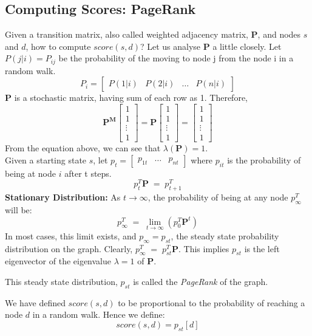 \documentclass{article}
\begin{document}
\subsection{Computing Scores: PageRank}
Given a transition matrix, also called weighted adjacency matrix, $\mathbf P$, and nodes $s$ and $d$, how to compute $score(s,d)$?
Let us analyse $\mathbf P$ a little closely. Let $P(j|i) = P_{ij}$ be the probability of the moving to node j from the node i in a random walk.
\begin{equation*}
    P_ i = 
    \begin{bmatrix}
    P(1 | i) & P(2 | i) & \dots & P(n | i) 
    \end{bmatrix}
\end{equation*}
$\mathbf P$ is a stochastic matrix, having sum of each row as 1. Therefore,
\begin{equation*}
    \mathbf{P^M}
    \begin{bmatrix}
    1 \\ 1 \\ \vdots \\ 1
    \end{bmatrix} = 
    \mathbf{P}
    \begin{bmatrix}
    1 \\ 1 \\ \vdots \\ 1
    \end{bmatrix} = 
    \begin{bmatrix}
    1 \\ 1 \\ \vdots \\ 1
    \end{bmatrix}
\end{equation*}
From the equation above, we can see that $\lambda(\mathbf{P}) = 1$.\\
Given a starting state $s$, let $p_t = \begin{bmatrix}
    p_{1t} & \dots & p_{nt} 
    \end{bmatrix}$ where $p_{it}$ is the probability of being at node $i$ after t steps.
\begin{equation*}
    p_t^T \mathbf{P} \; = \; p_{t+1}^T
\end{equation*}
\textbf{Stationary Distribution:} As $t\to \infty$, the probability of being at any node $p_{\infty}^T$ will be:
\begin{equation*}
    p_{\infty}^T \; = \; \lim_{t \to \infty}{(p_0^T \mathbf{P}^t)}
\end{equation*}
In most cases, this limit exists, and $p_{\infty} = p_{st}$, the steady state probability distribution on the graph. Clearly, $    p_{\infty}^T \; = \; p_{st}^T \mathbf{P}$. This implies $p_{st}$ is the left eigenvector of the eigenvalue $\lambda = 1$ of $\mathbf{P}$.\par
This steady state distribution, $p_{st}$ is called the {\it PageRank} of the graph.
\par
We have defined $score(s,d)$ to be proportional to the probability of reaching a node $d$ in a random walk. Hence we define:
$$score(s,d) = p_{st}[d]$$
\end{document}
